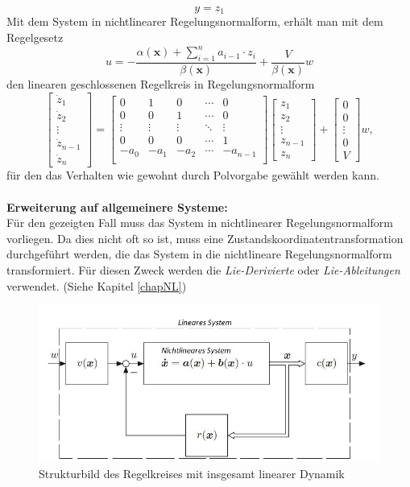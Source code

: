 		 	\[y = z_{1}\]	
			Mit dem System in nichtlinearer Regelungsnormalform, erhält man mit dem Regelgesetz
			\[u = - \dfrac{\alpha(\bm{x})+\sum_{i=1}^{n}a_{i-1}\cdot z_{i}}{\beta(\bm{x})} + \dfrac{V}{\beta(\bm{x})}w\]
			den linearen geschlossenen Regelkreis in Regelungsnormalform
			\[\begin{bmatrix}\dot{z}_{1}\\\dot{z}_{2}\\\vdots\\\dot{z}_{n-1}\\ \dot{z}_{n}\end{bmatrix} = \begin{bmatrix}0 & 1 & 0 & \dotsm & 0 \\
			0 & 0 & 1 & \dotsm & 0 \\
			\vdots & \vdots & \vdots & \ddots & \vdots\\
			0 & 0 & 0 & \dotsm & 1 \\
			-a_{0} & -a_{1} & -a_{2} & \dotsm & -a_{n-1} \\\end{bmatrix}
			\begin{bmatrix}z_{1}\\z_{2}\\\vdots\\z_{n-1}\\ z_{n}\end{bmatrix}+	\begin{bmatrix} 0\\0\\\vdots\\0\\V\end{bmatrix}w,\]
			für den das Verhalten wie gewohnt durch Polvorgabe gewählt werden kann.\\\\			
			\textbf{Erweiterung auf allgemeinere Systeme:\\}
			Für den gezeigten Fall muss das System in nichtlinearer Regelungsnormalform vorliegen. Da dies nicht oft so ist, muss eine Zustandskoordinatentransformation durchgeführt werden, die das System in die nichtlineare Regelungsnormalform transformiert. Für diesen Zweck werden die \textit{Lie-Derivierte} oder \textit{Lie-Ableitungen} verwendet. (Siehe Kapitel \ref{chapNL})
			\begin{figure}[h]
				\centering
				\includegraphics[width=0.8\linewidth]{./pics/re/dlin}
				\caption{Strukturbild des Regelkreises mit insgesamt linearer Dynamik}
			\end{figure}
